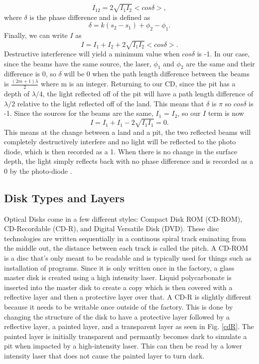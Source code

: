 \documentclass[ notitlepage, numerical, 11pt]{revtex4-1} %
\begin{document}
\begin{equation}
I_{12} = 2\sqrt{I_1 I_2}<cos\delta>,
\label{iInf2}
\end{equation}
where $\delta$ is the phase difference and is defined as 
\begin{equation}
\delta = k(s_2 - s_1) +\phi_2 -\phi_1.
\label{delta}
\end{equation}
Finally, we can write $I$ as 
\begin{equation}
I = I_1 + I_2 +  2\sqrt{I_1 I_2}<cos\delta>.
\label{finalI}
\end{equation}
Destructive interference will yield a minimum value when $cos\delta$ is -1. In our case, since the beams have the same source, the laser, $\phi_1$ and $\phi_2$ are the same and their difference is 0, so $\delta$ will be 0 when the path length difference between the beams is $\frac{(2m+1)\lambda}{2}$ where m is an integer. Returning to our CD, since the pit has a depth of $\lambda/4$, the light reflected off of the pit will have a path length difference of $\lambda/2$ relative to the light reflected off of the land. This means that $\delta$ is $\pi$ so $cos\delta$ is -1. Since the sources for the beams are the same, $I_1$ = $I_2$, so our $I$ term is now
\begin{equation}
I = I_1 + I_1 - 2\sqrt{I_1 I_1} = 0.
\label{finalI2}
\end{equation}
This means at the change between a land and a pit, the two reflected beams will completely destructively interfere and no light will be reflected to the photo diode, which is then recorded as a 1. When there is no change in the surface depth, the light simply reflects back with no phase difference and is recorded as a 0 by the photo-diode \cite{memory}.

\subsection{Disk Types and Layers}
Optical Disks come in a few different styles: Compact Disk ROM (CD-ROM), CD-Recordable (CD-R), and Digital Versatile Disk (DVD). These disc technologies are written sequentially in a continous spiral track eminating from the middle out, the distance between each track is called the pitch. A CD-ROM is a disc that's only meant to be readable and is typically used for things such as installation of programs. Since it is only written once in the factory, a glass master disk is created using a high intensity laser. Liquid polycarbonate is inserted into the master disk to create a copy which is then covered with a reflective layer and then a protective layer over that. 
A CD-R is slightly different because it needs to be writable once outside of the factory. This is done by changing the structure of the disk to have a protective layer followed by a reflective layer, a painted layer, and a transparent layer as seen in Fig. \ref{cdR}. The painted layer is initially transparent and permantly becomes dark to simulate a pit when impacted by a high-intensity laser. This can then be read by a lower intensity laser that does not cause the painted layer to turn dark.
\end{document}
